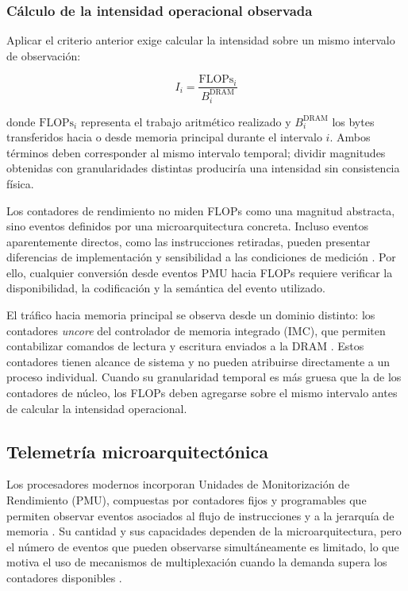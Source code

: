 \documentclass[12pt,oneside,spanish]{book}
\begin{document}
\subsubsection{Cálculo de la intensidad operacional observada}
\label{sec:intensidad}

Aplicar el criterio anterior exige calcular la intensidad sobre un mismo
intervalo de observación:

\begin{equation}
I_i = \frac{\text{FLOPs}_i}{B_i^{\text{DRAM}}}
\label{eq:intensidad}
\end{equation}

donde $\text{FLOPs}_i$ representa el trabajo aritmético realizado y
$B_i^{\text{DRAM}}$ los bytes transferidos hacia o desde memoria principal
durante el intervalo $i$. Ambos términos deben corresponder al mismo
intervalo temporal; dividir magnitudes obtenidas con granularidades
distintas produciría una intensidad sin consistencia física.

Los contadores de rendimiento no miden FLOPs como una magnitud abstracta,
sino eventos definidos por una microarquitectura concreta. Incluso eventos
aparentemente directos, como las instrucciones retiradas, pueden presentar
diferencias de implementación y sensibilidad a las condiciones de medición
\cite{Weaver2008}. Por ello, cualquier conversión desde eventos PMU hacia
FLOPs requiere verificar la disponibilidad, la codificación y la semántica
del evento utilizado.

El tráfico hacia memoria principal se observa desde un dominio distinto:
los contadores \textit{uncore} del controlador de memoria integrado
(IMC), que permiten contabilizar comandos de lectura y escritura enviados
a la DRAM \cite{IntelUncore2021}. Estos contadores tienen alcance de
sistema y no pueden atribuirse directamente a un proceso individual.
Cuando su granularidad temporal es más gruesa que la de los contadores de
núcleo, los FLOPs deben agregarse sobre el mismo intervalo antes de
calcular la intensidad operacional.

\subsection{Telemetría microarquitectónica}

Los procesadores modernos incorporan Unidades de Monitorización de
Rendimiento (PMU), compuestas por contadores fijos y programables que permiten
observar eventos asociados al flujo de instrucciones y a la jerarquía de
memoria \cite{Weaver2015,IntelSDM2026}. Su cantidad y sus capacidades dependen
de la microarquitectura, pero el número de eventos que pueden observarse
simultáneamente es limitado, lo que motiva el uso de mecanismos de
multiplexación cuando la demanda supera los contadores disponibles
\cite{Liu2024}.
\end{document}
